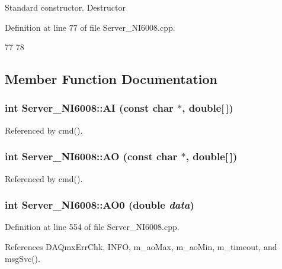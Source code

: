 Standard constructor. Destructor 

Definition at line 77 of file Server\_\-NI6008.cpp.


\begin{DoxyCode}
77                              {
78 }
\end{DoxyCode}


\subsection{Member Function Documentation}
\hypertarget{classServer__NI6008_a94705879717d5bcf129899e96be81675}{
\subsubsection[{AI}]{\setlength{\rightskip}{0pt plus 5cm}int Server\_\-NI6008::AI (const char $\ast$, \/  double\mbox{[}$\,$\mbox{]})}}
\label{classServer__NI6008_a94705879717d5bcf129899e96be81675}


Referenced by cmd().\hypertarget{classServer__NI6008_adde2efeb68363f67abb6d76c7ca2d761}{
\subsubsection[{AO}]{\setlength{\rightskip}{0pt plus 5cm}int Server\_\-NI6008::AO (const char $\ast$, \/  double\mbox{[}$\,$\mbox{]})}}
\label{classServer__NI6008_adde2efeb68363f67abb6d76c7ca2d761}


Referenced by cmd().\hypertarget{classServer__NI6008_a53ef808ed00d7b7105b62c2ce34faaec}{
\subsubsection[{AO0}]{\setlength{\rightskip}{0pt plus 5cm}int Server\_\-NI6008::AO0 (double {\em data})}}
\label{classServer__NI6008_a53ef808ed00d7b7105b62c2ce34faaec}


Definition at line 554 of file Server\_\-NI6008.cpp.

References DAQmxErrChk, INFO, m\_\-aoMax, m\_\-aoMin, m\_\-timeout, and msgSvc().



